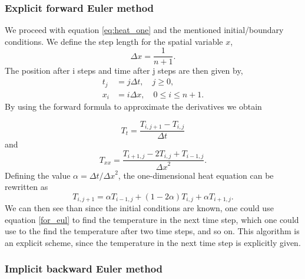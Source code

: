 \documentclass{article}
\begin{document}
\begin{multicols}{2}
\subsubsection{Explicit forward Euler method}
We proceed with equation \eqref{eq:heat_one} and the mentioned initial/boundary conditions. We define the step length for the spatial variable $x$,
\begin{equation}
	\Delta x=\frac{1}{n+1}.
\end{equation}
The position after i steps and time after j steps are then given by,
\begin{align*}
	t_j &= j\Delta t, \quad j \geq 0, \\
	x_i &= i\Delta x, \quad 0 \leq i \leq n+1.
\end{align*}
By using the forward formula to approximate the derivatives we obtain 
\begin{comment}
\begin{equation}
	T_t = \frac{T(x_i, t_j+\Delta t)-T(x_i, t_j)}{\Delta t}
\end{equation}
and 
\begin{equation}
	T_{xx}= \frac{T(x_i+\Delta x , t_j)-2T(x_i, t_j)+T(x_i-\Delta x, t_j)}{{\Delta x}^2}
\end{equation}
\end{comment}

\begin{equation}
	T_t=\frac{T_{i,j+1}-T_{i,j}}{\Delta t}
\end{equation}
and
\begin{equation}
	T_{xx}=\frac{T_{i+1,j}-2T_{i,j}+ T_{i-1,j}}{{\Delta x}^2}.
\end{equation}
Defining the value $\alpha = \Delta t/ {\Delta x}^2 $, the one-dimensional heat equation can be rewritten as
\begin{equation}
	T_{i,j+1}=\alpha T_{i-1,j}+(1-2\alpha )T_{i,j} + \alpha T_{i+1, j}. \label{for_eul}
\end{equation}
We can then see than since the initial conditions are known, one could use equation \eqref{for_eul} to find the temperature in the next time step, which one could use to the find the temperature after two time steps, and so on. This algorithm is an explicit scheme, since the temperature in the next time step is explicitly given. 

\subsubsection{Implicit backward Euler method}


\end{multicols}
\end{document}
